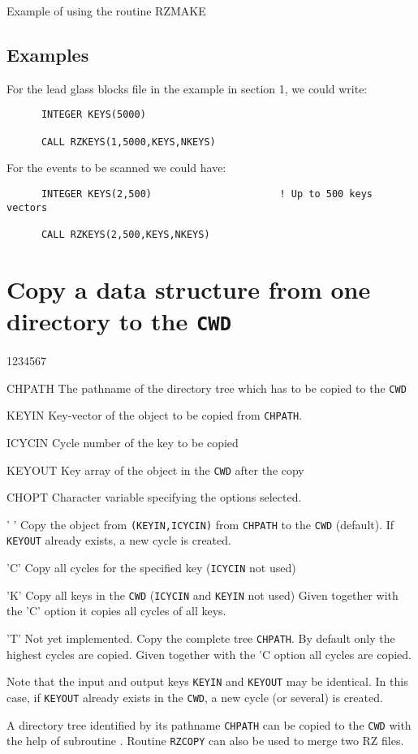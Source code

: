 \begin{XMPt}{Example of using the routine RZMAKE}
\subsection{Examples}
\par 
For the lead glass blocks file in the example in
section 1, we could write:
\begin{verbatim}
      INTEGER KEYS(5000)
 
      CALL RZKEYS(1,5000,KEYS,NKEYS)
\end{verbatim}
For the events to be scanned we could have:
\begin{verbatim}
      INTEGER KEYS(2,500)                      ! Up to 500 keys vectors
 
      CALL RZKEYS(2,500,KEYS,NKEYS)
\end{verbatim}
\section{Copy a data structure from one directory to the \tt CWD}
\Idesc
\begin{DLtt}{1234567}
\item[CHPATH]The pathname of the directory tree which has to be copied
to the {\tt CWD}
\item[KEYIN]Key-vector of the object to be copied from {\tt CHPATH}.
\item[ICYCIN]Cycle number of the key to be copied
\item[KEYOUT]Key array of the object in the {\tt CWD} after the copy
\item[CHOPT]Character variable specifying the options selected.
\begin{DLtt}{12}
\item[' ']Copy the object from {\tt (KEYIN,ICYCIN)} from
{\tt CHPATH} to the {\tt CWD} (default).
\newline If {\tt KEYOUT} already exists, a new cycle is created.
\item['C']Copy all cycles for the specified key ({\tt ICYCIN} not used)
\item['K']Copy all keys in the {\tt CWD} ({\tt ICYCIN} and {\tt KEYIN} not used)
\newline
Given together with the 'C' option it copies all cycles of all keys.
\item['T']Not yet implemented. Copy the complete tree {\tt CHPATH}.
By default only the highest cycles are copied.
\newline Given together with the 'C option all cycles are copied.
\end{DLtt}
\end{DLtt}
\par Note that the input and output keys {\tt KEYIN} and {\tt KEYOUT} may be
identical. In this case, if {\tt KEYOUT} already exists in the {\tt CWD}, a new
cycle (or several) is created.
\par 
A directory tree identified by its
pathname {\tt CHPATH} can be copied
to the {\tt CWD} with the help of subroutine .
Routine {\tt RZCOPY} can also be used to merge two RZ files.

\end{XMPt}
